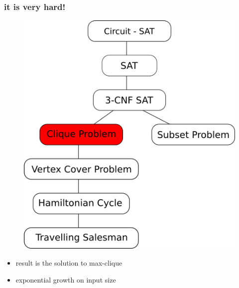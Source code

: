 \documentclass{beamer}
\begin{document}
\begin{frame}
	\frametitle{it is very hard!}

	\begin{figure}
	\centering
	\includegraphics[scale=0.3]{figs/Relative_NPC_chart}
	\end{figure}
	\begin{itemize}
		\item result is the solution to max-clique
		\item exponential growth on input size
	\end{itemize}
	
\end{frame}
\end{document}
